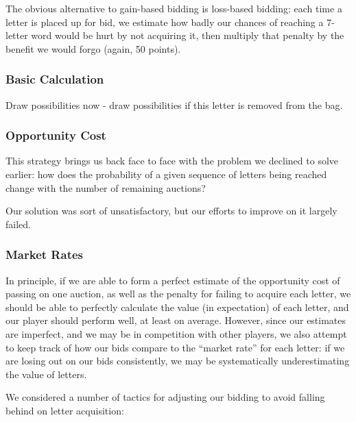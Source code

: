 \documentclass[11pt]{article}
\begin{document}
The obvious alternative to gain-based bidding is loss-based bidding: each time a letter is placed up for bid, we estimate how badly our chances of reaching a 7-letter word would be hurt by not acquiring it, then multiply that penalty by the benefit we would forgo (again, 50 points).  

\subsubsection{Basic Calculation}

Draw possibilities now - draw possibilities if this letter is removed from the bag.

\subsubsection{Opportunity Cost}

This strategy brings us back face to face with the problem we declined to solve earlier: how does the probability of a given sequence of letters being reached change with the number of remaining auctions?  

Our solution was sort of unsatisfactory, but our efforts to improve on it largely failed.

\subsubsection{Market Rates}

In principle, if we are able to form a perfect estimate of the opportunity cost of passing on one auction, as well as the penalty for failing to acquire each letter, we should be able to perfectly calculate the value (in expectation) of each letter, and our player should perform well, at least on average.  However, since our estimates are imperfect, and we may be in competition with other players, we also attempt to keep track of how our bids compare to the ``market rate'' for each letter: if we are losing out on our bids consistently, we may be systematically underestimating the value of letters.

We considered a number of tactics for adjusting our bidding to avoid falling behind on letter acquisition:
\end{document}
